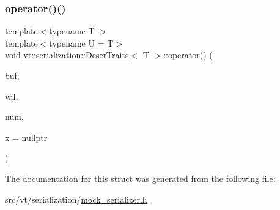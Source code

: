 \subsubsection{\texorpdfstring{operator()()}{operator()()}\hspace{0.1cm}{\footnotesize\ttfamily [2/2]}}
{\footnotesize\ttfamily template$<$typename T $>$ \\
template$<$typename U  = T$>$ \\
void \hyperlink{structvt_1_1serialization_1_1_deser_traits}{vt\+::serialization\+::\+Deser\+Traits}$<$ T $>$\+::operator() (\begin{DoxyParamCaption}\item[{\hyperlink{namespacevt_1_1serialization_a74f8d1a55940f9c38fc29522de66d926}{Serial\+Byte\+Type} $\ast$}]{buf,  }\item[{T \&}]{val,  }\item[{Size\+Type}]{num,  }\item[{\hyperlink{structvt_1_1serialization_1_1_deser_traits_a76eb20c400792b9288eabf2a7ffca4ba}{is\+Not\+Vec\+Type}$<$ U $>$ $\ast$}]{x = {\ttfamily nullptr} }\end{DoxyParamCaption})\hspace{0.3cm}{\ttfamily [inline]}}



The documentation for this struct was generated from the following file\+:\begin{DoxyCompactItemize}
\item 
src/vt/serialization/\hyperlink{mock__serializer_8h}{mock\+\_\+serializer.\+h}\end{DoxyCompactItemize}
